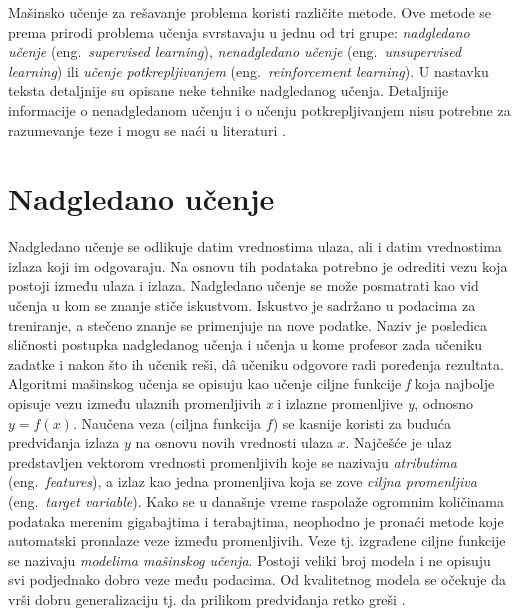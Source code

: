 \documentclass[12pt,oneside]{memoir}
\begin{document}
Mašinsko učenje za rešavanje problema koristi različite metode. Ove metode se prema prirodi problema učenja svrstavaju u jednu od tri grupe: \textit{nadgledano učenje} (eng.~\textit{supervised learning}), \textit{nenadgledano učenje} (eng.~\textit{unsupervised learning}) ili \textit{učenje potkrepljivanjem} (eng.~\textit{reinforcement learning}). U nastavku teksta detaljnije su opisane neke tehnike nadgledanog učenja. Detaljnije informacije o nenadgledanom učenju i o učenju potkrepljivanjem nisu potrebne za razumevanje teze i mogu se naći u literaturi \cite{mlm, reinforcement-learning, mladen}.

\section{Nadgledano učenje}
\label{sec:nadgledano}

Nadgledano učenje se odlikuje datim vrednostima ulaza, ali i datim vrednostima izlaza koji im odgovaraju. Na osnovu tih podataka potrebno je odrediti vezu koja postoji između ulaza i izlaza. Nadgledano učenje se može posmatrati kao vid učenja u kom se znanje stiče iskustvom. Iskustvo je sadržano u podacima za treniranje, a stečeno znanje se primenjuje na nove podatke.  Naziv je posledica sličnosti postupka nadgledanog učenja i učenja u kome profesor zada učeniku zadatke i nakon što ih učenik reši, d\^a učeniku odgovore radi poređenja rezultata. Algoritmi mašinskog učenja se opisuju kao učenje ciljne funkcije \textit{f} koja najbolje opisuje vezu između ulaznih promenljivih \textit{x} i izlazne promenljive \textit{y}, odnosno $y=f(x)$. Naučena veza (ciljna funkcija $f$) se kasnije koristi za buduća predviđanja izlaza $y$ na osnovu novih vrednosti ulaza $x$. Najčešće je ulaz predstavljen vektorom vrednosti promenljivih koje se nazivaju \textit{atributima} (eng.~\textit{features}), a izlaz kao jedna promenljiva koja se zove \textit{ciljna promenljiva} (eng.~\textit{target variable}). 
Kako se u današnje vreme raspolaže ogromnim količinama podataka merenim gigabajtima i terabajtima, neophodno je pronaći metode koje automatski pronalaze veze između promenljivih. Veze tj. izgrađene ciljne funkcije se nazivaju \textit{modelima mašinskog učenja}. Postoji veliki broj modela i ne opisuju svi podjednako dobro veze među podacima. Od kvalitetnog modela se očekuje da vrši dobru generalizaciju tj. da prilikom predviđanja retko greši \cite{mladen, mlm, UMLFTA}. %
\end{document}
